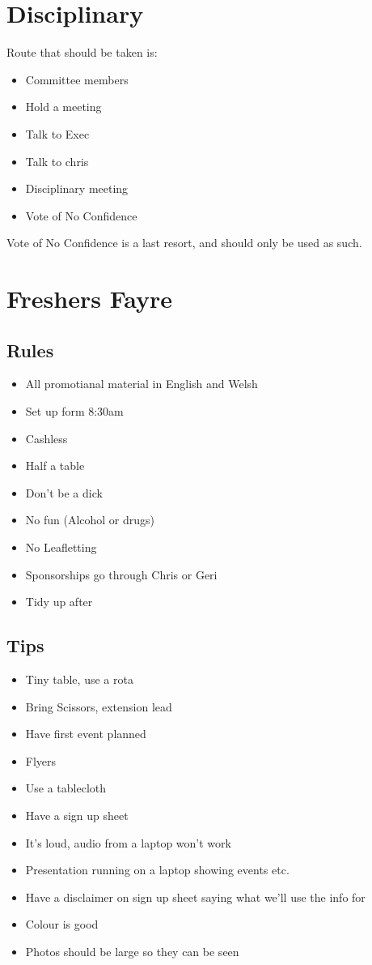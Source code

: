 \documentclass[12pt,a4paper]{article}
\begin{document}
\section{Disciplinary}
	Route that should be taken is:
	\begin{itemize}
		\item Committee members
		\item Hold a meeting
		\item Talk to Exec
		\item Talk to chris
		\item Disciplinary meeting
		\item Vote of No Confidence
	\end{itemize}		
	Vote of No Confidence is a last resort, and should only be used as such.
	
\section{Freshers Fayre}
	\subsection{Rules}
		\begin{itemize}
			\item All promotianal material in English and Welsh
			\item Set up form 8:30am
			\item Cashless
			\item Half a table
			\item Don't be a dick
			\item No fun (Alcohol or drugs)
			\item No Leafletting
			\item Sponsorships go through Chris or Geri
			\item Tidy up after
		\end{itemize}
		
	\subsection{Tips}
		\begin{itemize}
			\item Tiny table, use a rota
			\item Bring Scissors, extension lead
			\item Have first event planned
			\item Flyers
			\item Use a tablecloth
			\item Have a sign up sheet
			\item It's loud, audio from a laptop won't work
			\item Presentation running on a laptop showing events etc.
			\item Have a disclaimer on sign up sheet saying what we'll use the info for
			\item Colour is good
			\item Photos should be large so they can be seen
		\end{itemize}
			
\end{document}
